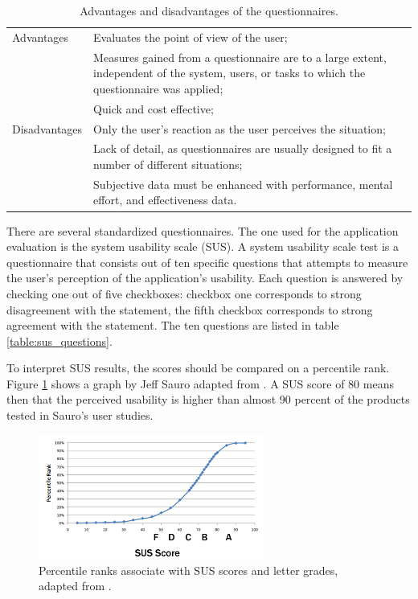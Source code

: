 \begin{table}%
	\begin{center}
		\begin{tabular}{l p{300px}}
			\hline
			Advantages		&		Evaluates the point of view of the user; \\
										&		Measures gained from a questionnaire are to a large extent, independent of the system, users, or tasks to which the questionnaire was applied; \\
										&		Quick and cost effective; \\
			\hline
			Disadvantages	&		Only the user's reaction as the user perceives the situation; \\
										&		Lack of detail, as questionnaires are usually designed to fit a number of different situations; \\
										&		Subjective data must be enhanced with performance, mental effort, and effectiveness data. \\
			\hline
		\end{tabular}
	\end{center}
	\caption{Advantages and disadvantages of the questionnaires.}
	\label{table:questionnaires}
\end{table}


There are several standardized questionnaires. The one used for the application evaluation is the system usability scale (SUS). A system usability scale test is a questionnaire that consists out of ten specific questions that attempts to measure the user's perception of the application's usability. Each question is answered by checking one out of five checkboxes: checkbox one corresponds to strong disagreement with the statement, the fifth checkbox corresponds to strong agreement with the statement\cite{sauro:2011}. The ten questions are listed in table \ref{table:sus_questions}.

To interpret SUS results, the scores should be compared on a percentile rank. Figure \ref{figure:sus_percentile} shows a graph by Jeff Sauro adapted from \cite{sauro:2011}. A SUS score of 80 means then that the perceived usability is higher than almost 90 percent of the products tested in Sauro's user studies.

\begin{figure}%
	\begin{center}
		\includegraphics[width=280px]{img/sus_curve}%
	\end{center}
	\caption{Percentile ranks associate with SUS scores and letter grades, adapted from \cite{sauro:2011}.}%
	\label{figure:sus_percentile}%
\end{figure}



